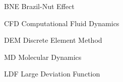 
\begin{siglas}
    \item[BNE] Brazil-Nut Effect
    \item[CFD] Computational Fluid Dynamics
    \item[DEM] Discrete Element Method
    \item[MD] Molecular Dynamics
    \item[LDF] Large Deviation Function
\end{siglas}

